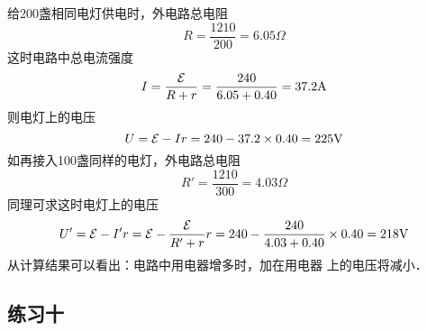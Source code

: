 \begin{enumerate}
\begin{solution}
给200盏相同电灯供电时，外电路总电阻
\[R=\frac{1210}{200}=6.05\Omega\]
这时电路中总电流强度
\[I=\dfrac{\mathcal{E}}{R+r}=\frac{240}{6.05+0.40}=37.2{\rm A}\]
则电灯上的电压
\[U=\mathcal{E}-Ir=240-37.2\times0.40=225{\rm V}\]
如再接入100盏同样的电灯，外电路总电阻
\[R'=\frac{1210}{300}=4.03\Omega\]
同理可求这时电灯上的电压
\[U'=\mathcal{E}-I'r=\mathcal{E}-\frac{\mathcal{E}}{R'+r}r=240-
\frac{240}{4.03+0.40}\times 0.40=218{\rm V}\]
从计算结果可以看出：电路中用电器增多时，加在用电器
上的电压将减小．
\end{solution}

\end{enumerate}




\subsection{练习十}
